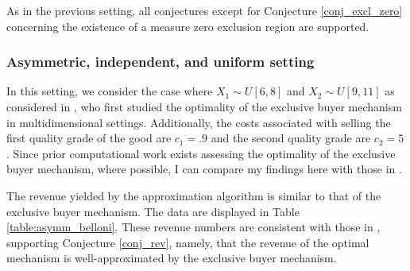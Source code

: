 


  

As in the previous setting, all conjectures except for Conjecture \ref{conj_excl_zero} concerning the existence of a measure zero exclusion region are supported.








\subsubsection{Asymmetric, independent, and uniform setting}

In this setting, we consider the case where $X_1 \sim U[6,8]$ and $X_2 \sim U[9,11]$ as considered in \autocite{belloni2010multidimensional}, who first studied the optimality of the exclusive buyer mechanism in multidimensional settings. Additionally, the costs associated with selling the first quality grade of the good are $c_1 = .9$ and the second quality grade are $c_2 = 5$. Since prior computational work exists assessing the optimality of the exclusive buyer mechanism, where possible, I can compare my findings here with those in \autocite{belloni2010multidimensional}. 

The revenue yielded by the approximation algorithm is similar to that of the exclusive buyer mechanism. The data are displayed in Table \ref{table:asymm_belloni}. These revenue numbers are consistent with those in \autocite[Table 3]{belloni2010multidimensional}, supporting Conjecture \ref{conj_rev}, namely, that the revenue of the optimal mechanism is well-approximated by the exclusive buyer mechanism.

